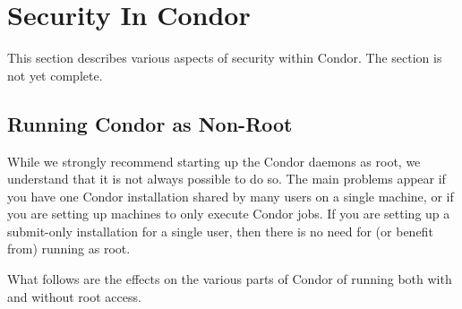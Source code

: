\section{\label{sec:Security}Security In Condor}

This section describes various aspects of security within Condor.
The section is not yet complete.

\subsection{\label{sec:Non-Root}Running Condor as Non-Root}

While we strongly recommend starting up the Condor daemons as root, we
understand that it is not always possible to do so.
The main problems appear
if you have one Condor installation shared by many users
on a single machine, or if you are setting up machines to only
execute Condor jobs.
If you are setting up a submit-only installation for
a single user, then there is no need for (or benefit from) running as
root.  

What follows are the effects on the various parts of Condor
of running both with and without root access.

